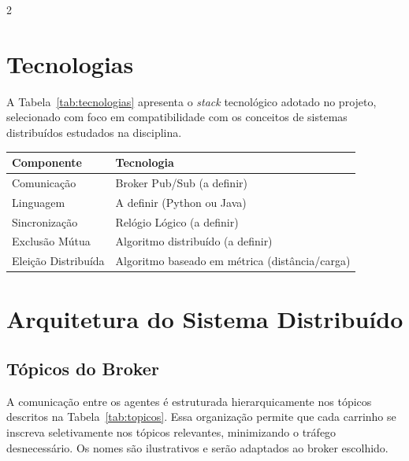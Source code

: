 \documentclass[a4paper]{article}
\begin{document}
\begin{multicols}{2}
\section{Tecnologias}

A Tabela~\ref{tab:tecnologias} apresenta o \textit{stack} tecnol\'ogico adotado no projeto, selecionado com foco em compatibilidade com os conceitos de sistemas distribu\'idos estudados na disciplina.

\noindent
\begin{minipage}{\columnwidth}
\centering
{}
\label{tab:tecnologias}
\vspace{0.3em}
\begin{tabular}{|l|l|}
\hline
\textbf{Componente} & \textbf{Tecnologia} \\ \hline
Comunica\c{c}\~ao & Broker Pub/Sub (a definir) \\ \hline
Linguagem & A definir (Python ou Java) \\ \hline
Sincroniza\c{c}\~ao & Rel\'ogio L\'ogico (a definir) \\ \hline
Exclus\~ao M\'utua & Algoritmo distribu\'ido (a definir) \\ \hline
Elei\c{c}\~ao Distribu\'ida & Algoritmo baseado em m\'etrica (dist\^ancia/carga) \\ \hline
\end{tabular}
\end{minipage}

\section{Arquitetura do Sistema Distribu\'ido}

\subsection{T\'opicos do Broker}

A comunica\c{c}\~ao entre os agentes \'e estruturada hierarquicamente nos t\'opicos descritos na Tabela~\ref{tab:topicos}. Essa organiza\c{c}\~ao permite que cada carrinho se inscreva seletivamente nos t\'opicos relevantes, minimizando o tr\'afego desnecess\'ario. Os nomes s\~ao ilustrativos e ser\~ao adaptados ao broker escolhido.


\end{multicols}
\end{document}
